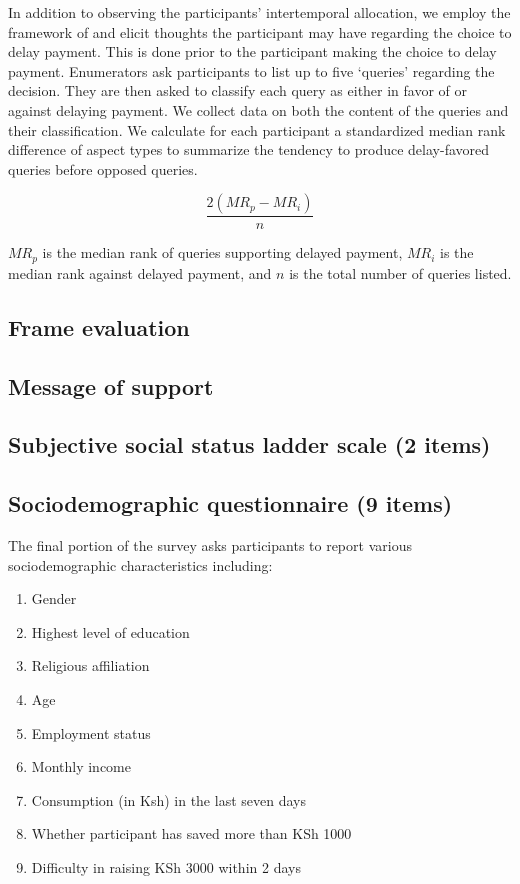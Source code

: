 \documentclass[11pt, a4paper]{article}\usepackage[]{graphicx}\usepackage[]{color}
\begin{document}
        In addition to observing the participants' intertemporal allocation, we employ the framework of \textcite{johnson_aspects_2007} and elicit thoughts the participant may have regarding the choice to delay payment. This is done prior to the participant making the choice to delay payment. Enumerators ask participants to list up to five `queries' regarding the decision. They are then asked to classify each query as either in favor of or against delaying payment. We collect data on both the content of the queries and their classification. We calculate for each participant a standardized median rank difference of aspect types to summarize the tendency to produce delay-favored queries before opposed queries.

        \begin{equation}
            \frac{2 (MR_p - MR_i)}{n}
        \end{equation}

        $MR_p$ is the median rank of queries supporting delayed payment, $MR_i$ is the median rank against delayed payment, and $n$ is the total number of queries listed.

    \subsection{Frame evaluation}
    \subsection{Message of support}
    \subsection{Subjective social status ladder scale (2 items)}
    \subsection{Sociodemographic questionnaire (9 items)}

        The final portion of the survey asks participants to report various sociodemographic characteristics including:

        \begin{enumerate}
            \item Gender
            \item Highest level of education
            \item Religious affiliation
            \item Age
            \item Employment status
            \item Monthly income
            \item Consumption (in Ksh) in the last seven days
            \item Whether participant has saved more than KSh 1000
            \item Difficulty in raising KSh 3000 within 2 days
        \end{enumerate}
\end{document}
